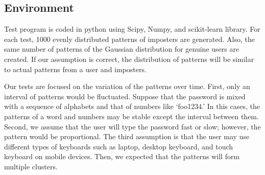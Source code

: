 \documentclass[twocolumn,showpacs,%
  nofootinbib,aps,%
  eqsecnum,prd,notitlepage,showkeys,10pt]{revtex4-1}
\begin{document}
\subsection{Environment}
Test program is coded in python using Scipy, Numpy, and scikit-learn library. For each test, 1000 evenly distributed patterns of imposters are generated. Also, the same number of patterns of the Gaussian distribution for genuine users are created. If our assumption is correct, the distribution of patterns will be similar to actual patterns from a user and imposters.
\par
Our tests are focused on the variation of the patterns over time. First, only an interval of patterns would be fluctuated. Suppose that the password is mixed with a sequence of alphabets and that of numbers like `foo1234.' In this cases, the patterns of a word and numbers may be stable except the interval between them. Second, we assume that the user will type the password fast or slow; however, the pattern would be proportional. The third assumption is that the user may use different types of keyboards such as laptop, desktop keyboard, and touch keyboard on mobile devices. Then, we expected that the patterns will form multiple clusters.
\end{document}
